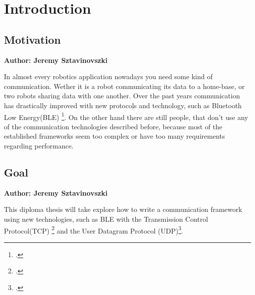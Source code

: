 \chapter{Introduction}

\makeatletter
\renewcommand\paragraph{\@startsection{paragraph}{4}{\z@}%
                                     {-3.25ex\@plus -1ex \@minus -.2ex}%
                                     {1.5ex \@plus .2ex}%
                                     {\normalfont\normalsize\bfseries}}
 \setcounter{secnumdepth}{4}
\makeatother

\vspace{2mm}

\section{Motivation}
\textbf{Author: Jeremy Sztavinovszki}

In almost every robotics application nowadays you need some kind of communication. Wether it is a robot communicating
its data to a home-base, or two robots sharing data with one another. Over the past years communication has drastically
improved with new protocols and technology, such as Bluetooth Low Energy(BLE) \footcite{bluetooth-low-energy}. On the other hand there are still people, that
don't use any of the communication technologies described before, because most of the established frameworks seem too
complex or have too many requirements regarding performance. 

\section{Goal}
\textbf{Author: Jeremy Sztavinovszki}

This diploma thesis will take explore how to write a communication framework using new technologies, such as BLE with the Transmission Control Protocol(TCP) \footcite{rfc9293}
and the User Datagram Protocol (UDP)\footcite{rfc768}.

